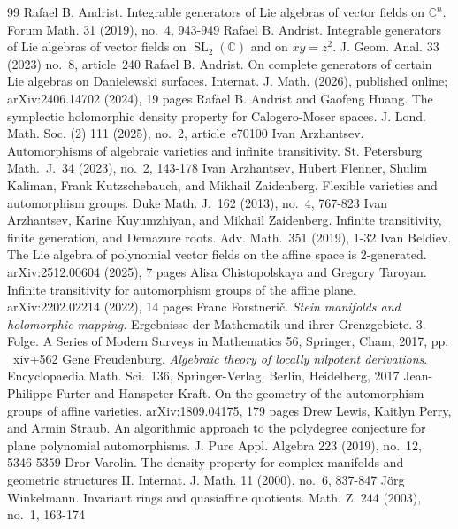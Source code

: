 \documentclass[a4paper,draft,reqno,12pt]{amsart}
\theoremstyle{definition}
\theoremstyle{remark}
\DeclareMathOperator{\SL}{SL}
\def\CC{{\mathbb C}}
\begin{document}
\begin{thebibliography}{99}
%
Rafael B. Andrist. Integrable generators of Lie algebras of vector fields on $\CC^n$. Forum Math. 31 (2019), no.~4, 943-949
%
Rafael B. Andrist. Integrable generators of Lie algebras of vector fields on $\SL_2(\CC)$ and on $xy = z^2$. J. Geom. Anal. 33 (2023) no.~8, article~240
%
Rafael B. Andrist. On complete generators of certain Lie algebras on Danielewski surfaces. Internat. J. Math. (2026), published online; arXiv:2406.14702 (2024), 19 pages
%
Rafael B. Andrist and Gaofeng Huang. The symplectic holomorphic density property for Calogero-Moser spaces. J. Lond. Math. Soc. (2) 111 (2025), no.~2, article~e70100 
%
Ivan Arzhantsev. Automorphisms of algebraic varieties and infinite transitivity. St. Petersburg Math.~J.~34 (2023), no.~2, 143-178
%
Ivan Arzhantsev, Hubert Flenner, Shulim Kaliman, Frank Kutzschebauch, and Mikhail Zaidenberg. Flexible varieties and automorphism groups. Duke Math. J.~162 (2013), no.~4, 767-823
%
Ivan Arzhantsev, Karine Kuyumzhiyan, and Mikhail Zaidenberg. Infinite transitivity, finite generation, and Demazure roots. Adv. Math.~351 (2019), 1-32
%
Ivan Beldiev. The Lie algebra of polynomial vector fields on the affine space is 2-generated. arXiv:2512.00604 (2025), 7 pages
%
Alisa Chistopolskaya and Gregory Taroyan. Infinite transitivity for automorphism groups of the affine plane. arXiv:2202.02214 (2022), 14 pages 
%
Franc Forstneri\v c. \emph{Stein manifolds and holomorphic mapping.} Ergebnisse der Mathematik und ihrer Grenzgebiete. 3. Folge. A Series of Modern Surveys in Mathematics 56, Springer, Cham, 2017, pp. ~xiv+562
%
Gene Freudenburg. \emph{Algebraic theory of locally nilpotent derivations}. Encyclopaedia Math. Sci.~136, Springer-Verlag, Berlin, Heidelberg, 2017
%
Jean-Philippe Furter and Hanspeter Kraft. On the geometry of the automorphism groups of affine varieties. arXiv:1809.04175,  179 pages
%
Drew Lewis, Kaitlyn Perry, and Armin Straub. An algorithmic approach to the polydegree conjecture for plane polynomial automorphisms.  J. Pure Appl. Algebra 223 (2019), no.~12, 5346-5359
%
Dror Varolin. The density property for complex manifolds and geometric structures II. Internat. J. Math. 11 (2000), no.~6, 837-847  
%
J\"org Winkelmann. Invariant rings and quasiaffine quotients. Math. Z. 244 (2003), no.~1, 163-174 
%
\end{thebibliography}
\end{document}
